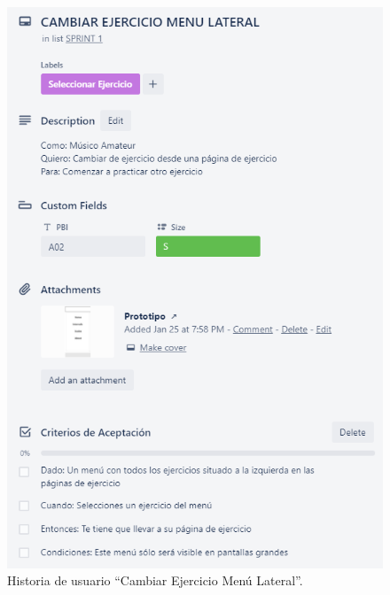 \documentclass[12pt,twoside,titlepage]{report}
\begin{document}
{\begin{figure}[H]
    \centering
    \includegraphics[scale=1.3]{Scrum/User Stories/MenuLateral}
    \caption{Historia de usuario ``Cambiar Ejercicio Menú Lateral''.}
    \label{fig:MenuLateral}
\end{figure}

}
\end{document}

